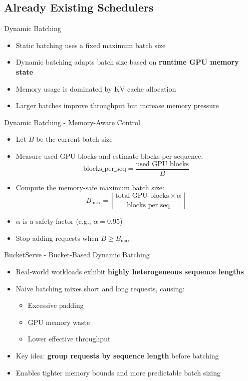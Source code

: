 \documentclass[Serif, 10pt, brown]{beamer}
\theoremstyle{example}
\theoremstyle{plain}
\begin{document}
\subsection{Already Existing Schedulers}

\begin{frame}{Dynamic Batching}
    \begin{itemize}
        \item Static batching uses a fixed maximum batch size
        \item Dynamic batching adapts batch size based on \textbf{runtime GPU memory state}
        \item Memory usage is dominated by KV cache allocation
        \item Larger batches improve throughput but increase memory pressure
    \end{itemize}
\end{frame}

\begin{frame}{Dynamic Batching - Memory-Aware Control}
    \begin{itemize}
        \item Let $B$ be the current batch size
        \item Measure used GPU blocks and estimate blocks per sequence:
        \[
            \text{blocks\_per\_seq} = \frac{\text{used GPU blocks}}{B}
        \]
        \item Compute the memory-safe maximum batch size:
        \[
            B_{\max} =
            \left\lfloor
            \frac{\text{total GPU blocks} \times \alpha}
                 {\text{blocks\_per\_seq}}
            \right\rfloor
        \]
        \item $\alpha$ is a safety factor (e.g., $\alpha = 0.95$)
        \item Stop adding requests when $B \ge B_{\max}$
    \end{itemize}
\end{frame}



\begin{frame}{BucketServe - Bucket-Based Dynamic Batching}
    \begin{itemize}
        \item Real-world workloads exhibit \textbf{highly heterogeneous sequence lengths}
        \item Naive batching mixes short and long requests, causing:
        \begin{itemize}
            \item Excessive padding
            \item GPU memory waste
            \item Lower effective throughput
        \end{itemize}
        \item Key idea: \textbf{group requests by sequence length} before batching
        \item Enables tighter memory bounds and more predictable batch sizing
    \end{itemize}
\end{frame}
\end{document}
